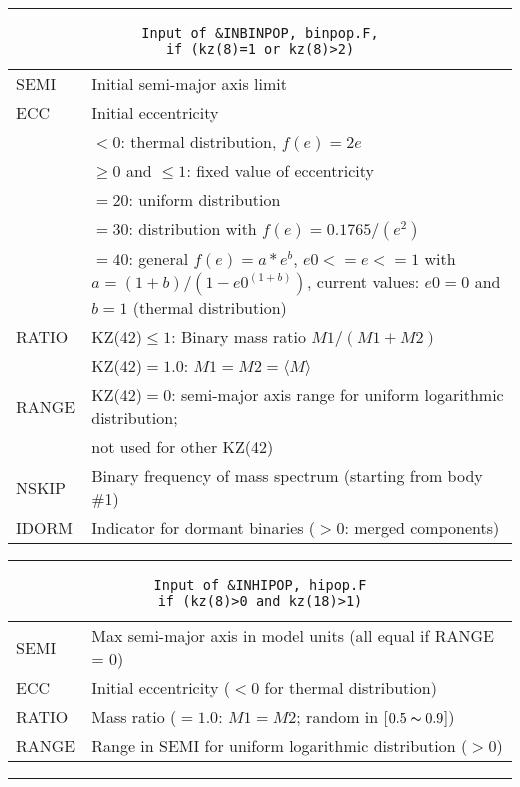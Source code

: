 \hrule
\noindent
\begin{longtable}{@{}p{1.5cm}p{13.0cm}}
\caption{\texttt{Input of \&INBINPOP, binpop.F, \\\phantom{xxxxxxxx}if (kz(8)=1 or kz(8)>2)}}
\label{table:inbinpop}\\\hline
%
SEMI   & Initial semi-major axis limit\\
ECC    & Initial eccentricity \\
        & $<0$: thermal distribution, $f(e)=2e$ \\
        & $\ge 0$ and $\le 1$: fixed value of eccentricity\\
        & $=20$: uniform distribution \\
        & $=30$: distribution with $f(e)=0.1765/(e^2)$ \\
        & $=40$: general $f(e)=a*e^b$, $e0<=e<=1$ with $a=(1+b)/(1-e0^{(1+b)})$, current values: $e0=0$ and $b=1$ (thermal distribution) \\
RATIO   & KZ(42)$\le 1$: Binary mass ratio $M1/(M1 + M2)$\\
        & KZ(42)$=1.0$: $M1 = M2 = \langle M \rangle$\\
RANGE   & KZ(42)$=0$: semi-major axis range for uniform logarithmic distribution; \\
        & not used for other KZ(42)\\
NSKIP   & Binary frequency of mass spectrum (starting from body \#1)\\
IDORM   & Indicator for dormant binaries ($>0$: merged components)\\
\end{longtable}

\hrule
\noindent
\begin{longtable}{@{}p{1.5cm}p{13.0cm}}
\caption{\texttt{Input of \&INHIPOP, hipop.F\\\phantom{xxxxxxx} if (kz(8)>0 and kz(18)>1)}}
\label{table:inhipop}\\\hline
%
SEMI  &  Max semi-major axis in model units (all equal if RANGE = 0) \\
ECC   &  Initial eccentricity ($<0$ for thermal distribution) \\
RATIO &  Mass ratio ($= 1.0$: $M1 = M2$; random in [$0.5\thicksim0.9$]) \\
RANGE &  Range in SEMI for uniform logarithmic distribution ($> 0$) \\
\end{longtable}

\hrule
\noindent


